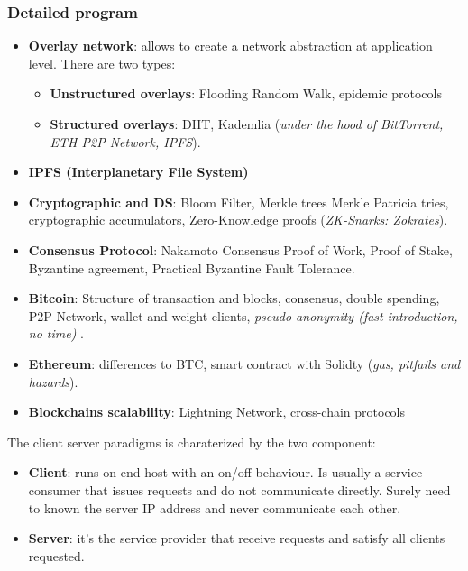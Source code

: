 \documentclass[10pt,a4paper]{report}
\begin{document}
\subsubsection{Detailed program}\label{sec:detailed-program}\begin{itemize}
	\item 
	\textbf{Overlay network}: allows to create a network abstraction at application level. There are two types:
	\begin{itemize}
		\item 
		\textbf{Unstructured overlays}: Flooding Random Walk, epidemic protocols
		\item 
		\textbf{Structured overlays}: DHT, Kademlia (\textit{under the hood of BitTorrent, ETH P2P Network, IPFS}).
	\end{itemize}
	\item 
	\textbf{IPFS (Interplanetary File System)}
	\item 
	\textbf{Cryptographic and DS}: Bloom Filter, Merkle trees Merkle Patricia tries, cryptographic accumulators, Zero-Knowledge proofs (\textit{ZK-Snarks: Zokrates}).
	\item 
	\textbf{Consensus Protocol}: Nakamoto Consensus Proof of Work, Proof of Stake, Byzantine agreement, Practical Byzantine Fault Tolerance.
	\item 
	\textbf{Bitcoin}: Structure of transaction and blocks, consensus, double spending, P2P Network, wallet and weight clients, \textit{pseudo-anonymity (fast introduction, no time)} .
	\item 
	\textbf{Ethereum}: differences to BTC, smart contract with Solidty (\textit{gas, pitfails and hazards}).
	\item 
	\textbf{Blockchains scalability}: Lightning Network, cross-chain protocols
\end{itemize}
\fi
The client server paradigms is charaterized by the two component:
\begin{itemize}
	\item 
	\textbf{Client}: runs on end-host with an on/off behaviour. Is usually a service consumer that issues requests and do not communicate directly. Surely need to known the server IP address and never communicate each other.
	\item 
	\textbf{Server}: it's the service provider that receive requests and satisfy all clients requested.
\end{itemize}
\end{document}
